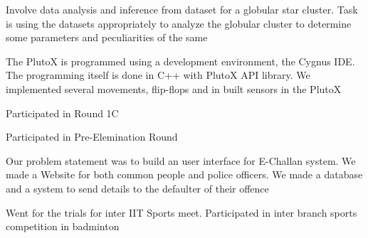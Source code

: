 {Involve data analysis and inference from dataset for a globular star cluster. Task is using the datasets appropriately to analyze the globular cluster to determine some parameters and peculiarities of the same}
{}

{The PlutoX is programmed using a development environment, the Cygnus IDE. The programming itself is done in C++ with PlutoX API library. We implemented several movements, flip-flops and in built sensors in the PlutoX}
{}

{Participated in Round 1C}
{}

{Participated in Pre-Elemination Round}
{}

{Our problem statement was to build an user interface for E-Challan system. We made a Website for both common people and police officers. We made a database and a system to send details to the defaulter of their offence}
{}


{Went for the trials for inter IIT Sports meet. Participated in inter branch sports competition in badminton}


